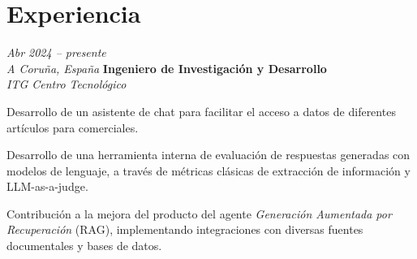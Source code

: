 \section{Experiencia}

\begin{twocolentry}{
    \textit{Abr 2024 – presente} \\
    \textit{A Coruña, España}}  
    \textbf{Ingeniero de Investigación y Desarrollo} \\
    \textit{ITG Centro Tecnológico}
\end{twocolentry}

\vspace{0.20 cm}
\begin{onecolentry}
    \begin{highlights}
        \item Desarrollo de un asistente de chat para facilitar el acceso a datos de diferentes artículos para comerciales.
        \item Desarrollo de una herramienta interna de evaluación de respuestas generadas con modelos de lenguaje, a través de métricas clásicas de extracción de información y LLM-as-a-judge.
        \item Contribución a la mejora del producto del agente \textit{Generación Aumentada por Recuperación} (RAG), implementando integraciones con diversas fuentes documentales y bases de datos.
    \end{highlights}
\end{onecolentry}